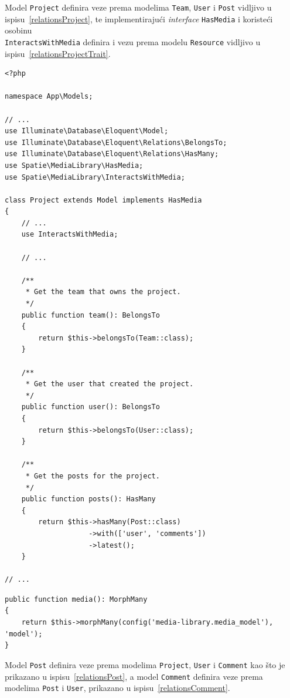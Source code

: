 Model \texttt{Project} definira veze prema modelima \texttt{Team}, \texttt{User} i \texttt{Post} vidljivo u ispisu~\ref{relationsProject}, te implementirajući \textit{interface} \texttt{HasMedia} i koristeći osobinu \\ \texttt{InteractsWithMedia} definira i vezu prema modelu \texttt{Resource} vidljivo u ispisu~\ref{relationsProjectTrait}.

\begin{lstlisting}[caption={Relacije modela \texttt{Project}}, label=relationsProject]
<?php

namespace App\Models;

// ...
use Illuminate\Database\Eloquent\Model;
use Illuminate\Database\Eloquent\Relations\BelongsTo;
use Illuminate\Database\Eloquent\Relations\HasMany;
use Spatie\MediaLibrary\HasMedia;
use Spatie\MediaLibrary\InteractsWithMedia;

class Project extends Model implements HasMedia
{
    // ...
    use InteractsWithMedia;
    
    // ...
    
    /**
     * Get the team that owns the project.
     */
    public function team(): BelongsTo
    {
        return $this->belongsTo(Team::class);
    }

    /**
     * Get the user that created the project.
     */
    public function user(): BelongsTo
    {
        return $this->belongsTo(User::class);
    }

    /**
     * Get the posts for the project.
     */
    public function posts(): HasMany
    {
        return $this->hasMany(Post::class)
                    ->with(['user', 'comments'])
                    ->latest();
    }
    
// ...
\end{lstlisting}

\begin{lstlisting}[caption={Relacije modela \texttt{Project} koje koristi iz osobine \texttt{InteractsWithMedia}}, label=relationsProjectTrait]
public function media(): MorphMany
{
    return $this->morphMany(config('media-library.media_model'), 'model');
}
\end{lstlisting}

Model \texttt{Post} definira veze prema modelima \texttt{Project}, \texttt{User} i \texttt{Comment} kao što je prikazano u ispisu~\ref{relationsPost}, a model \texttt{Comment} definira veze prema modelima \texttt{Post} i \texttt{User}, prikazano u ispisu~\ref{relationsComment}.

